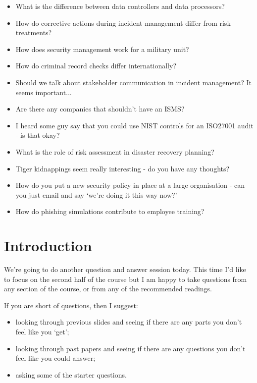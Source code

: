 \documentclass[12pt]{article}
\begin{document}
\begin{itemize}
  \item What is the difference between data controllers and data processors?
  \item How do corrective actions during incident management differ from risk treatments?
  \item How does security management work for a military unit?
  \item How do criminal record checks differ internationally?
  \item Should we talk about stakeholder communication in incident management? It seems important...
  \item Are there any companies that shouldn't have an ISMS?
  \item I heard some guy say that you could use NIST controls for an ISO27001 audit - is that okay?
  \item What is the role of risk assessment in disaster recovery planning?
  \item Tiger kidnappings seem really interesting - do you have any thoughts?
  \item How do you put a new security policy in place at a large organisation - can you just email and say `we're doing it this way now?'
  \item How do phishing simulations contribute to employee training?
\end{itemize}


%
%



\maketitle

\section*{Introduction}
We're going to do another question and answer session today. This time I'd like to focus on the second half of the course but I am happy to take questions from any section of the course, or from any of the recommended readings. 

If you are short of questions, then I suggest: 

\begin{itemize} 
\item looking through previous slides and seeing if there are any parts you don't feel like you `get';
\item looking through past papers and seeing if there are any questions you don't feel like you could answer;
\item asking some of the starter questions.
\end{itemize} 
\end{document}
